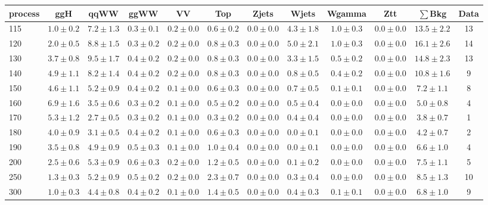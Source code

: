 \begin{table}[!hb]
{\footnotesize
 \begin{center}
 \begin{tabular}{l c c c c c c c c c c c }
 \hline
 process & ggH & qqWW & ggWW & VV & Top & Zjets & Wjets & Wgamma & Ztt & $\sum$Bkg & Data \\
 \hline
115 & $1.0\pm0.2$ & $7.2\pm1.3$ & $0.3\pm0.1$ & $0.2\pm0.0$ & $0.6\pm0.2$ & $0.0\pm0.0$ & $4.3\pm1.8$ & $1.0\pm0.3$ & $0.0\pm0.0$ & $13.5\pm2.2$ & 13 \\
120 & $2.0\pm0.5$ & $8.8\pm1.5$ & $0.3\pm0.2$ & $0.2\pm0.0$ & $0.8\pm0.3$ & $0.0\pm0.0$ & $5.0\pm2.1$ & $1.0\pm0.3$ & $0.0\pm0.0$ & $16.1\pm2.6$ & 14 \\
130 & $3.7\pm0.8$ & $9.5\pm1.7$ & $0.4\pm0.2$ & $0.2\pm0.0$ & $0.8\pm0.3$ & $0.0\pm0.0$ & $3.3\pm1.5$ & $0.5\pm0.2$ & $0.0\pm0.0$ & $14.8\pm2.3$ & 13 \\
140 & $4.9\pm1.1$ & $8.2\pm1.4$ & $0.4\pm0.2$ & $0.2\pm0.0$ & $0.8\pm0.3$ & $0.0\pm0.0$ & $0.8\pm0.5$ & $0.4\pm0.2$ & $0.0\pm0.0$ & $10.8\pm1.6$ & 9 \\
150 & $4.6\pm1.1$ & $5.2\pm0.9$ & $0.4\pm0.2$ & $0.1\pm0.0$ & $0.6\pm0.3$ & $0.0\pm0.0$ & $0.7\pm0.5$ & $0.1\pm0.1$ & $0.0\pm0.0$ & $7.2\pm1.1$ & 8 \\
160 & $6.9\pm1.6$ & $3.5\pm0.6$ & $0.3\pm0.2$ & $0.1\pm0.0$ & $0.5\pm0.2$ & $0.0\pm0.0$ & $0.5\pm0.4$ & $0.0\pm0.0$ & $0.0\pm0.0$ & $5.0\pm0.8$ & 4 \\
170 & $5.3\pm1.2$ & $2.7\pm0.5$ & $0.3\pm0.2$ & $0.1\pm0.0$ & $0.3\pm0.2$ & $0.0\pm0.0$ & $0.4\pm0.4$ & $0.0\pm0.0$ & $0.0\pm0.0$ & $3.8\pm0.7$ & 1 \\
180 & $4.0\pm0.9$ & $3.1\pm0.5$ & $0.4\pm0.2$ & $0.1\pm0.0$ & $0.6\pm0.3$ & $0.0\pm0.0$ & $0.0\pm0.1$ & $0.0\pm0.0$ & $0.0\pm0.0$ & $4.2\pm0.7$ & 2 \\
190 & $3.5\pm0.8$ & $4.9\pm0.9$ & $0.5\pm0.3$ & $0.1\pm0.0$ & $1.0\pm0.4$ & $0.0\pm0.0$ & $0.0\pm0.1$ & $0.0\pm0.0$ & $0.0\pm0.0$ & $6.6\pm1.0$ & 4 \\
200 & $2.5\pm0.6$ & $5.3\pm0.9$ & $0.6\pm0.3$ & $0.2\pm0.0$ & $1.2\pm0.5$ & $0.0\pm0.0$ & $0.1\pm0.2$ & $0.0\pm0.0$ & $0.0\pm0.0$ & $7.5\pm1.1$ & 5 \\
250 & $1.3\pm0.3$ & $5.2\pm0.9$ & $0.5\pm0.2$ & $0.2\pm0.0$ & $2.3\pm0.7$ & $0.0\pm0.0$ & $0.3\pm0.4$ & $0.0\pm0.0$ & $0.0\pm0.0$ & $8.5\pm1.3$ & 10 \\
300 & $1.0\pm0.3$ & $4.4\pm0.8$ & $0.4\pm0.2$ & $0.1\pm0.0$ & $1.4\pm0.5$ & $0.0\pm0.0$ & $0.4\pm0.3$ & $0.1\pm0.1$ & $0.0\pm0.0$ & $6.8\pm1.0$ & 9 \\

\end{tabular}
\end{center}}
\end{table}
